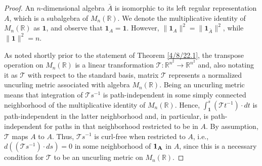 \documentclass{amsart}
\numberwithin{equation}{section}
\theoremstyle{definition}
\numberwithin{theorem}{section}
\begin{document}
\begin{proof} 
An $n$-dimensional algebra $\bar{A}$ is isomorphic to its left regular representation $A$, which is a subalgebra  of $ M_n(\mathbb{R})$.   We denote the multiplicative identity of $ M_n(\mathbb{R})$ as $\mathbf{1}$, and observe that $\mathbf{1}_A = \mathbf{1}$.  However, $\|\mathbf{1}_A\|^2 = \|\mathbf{1}_{\bar{A}}\|^2$, while $\|\mathbf{1}\|^2 = n$.   

As noted shortly prior to the statement of Theorem \ref{4/8/22.1}, the transpose operation on $ M_n(\mathbb{R})$ is a linear transformation $\mathcal{\mathcal{T}}:\mathbb{R}^{n^2}\rightarrow \mathbb{R}^{n^2}$ and, also notating it as $\mathcal{\mathcal{T}}$ with respect to the standard basis, matrix $\mathcal{\mathcal{T}}$ represents a normalized uncurling metric associated with algebra  $ M_n(\mathbb{R})$.  Being an uncurling metric means that integration of $\mathcal{\mathcal{T}}s^{-1}$ is path-independent in some simply connected neighborhood of the multiplicative identity of $ M_n(\mathbb{R})$.  
 Hence, $\int_\mathbf{1}^s (\mathcal{\mathcal{T}}t^{-1})\cdot dt$ is path-independent in the latter neighborhood and, in particular, is path-independent for paths in that neighborhood restricted to be in $A$.  By assumption, $\mathcal{\mathcal{T}}$ maps $A$ to $A$. 
 Thus, $\mathcal{\mathcal{T}}s^{-1}$ is curl-free when restricted to $A$, i.e., 
  $d((\mathcal{\mathcal{T}}s^{-1})\cdot ds) = 0$ in some neighborhood of $\bf{1}_A$ in $A$, since this is a necessary condition for $\mathcal{T}$ to be an uncurling metric on $ M_n(\mathbb{R})$.
  

\end{proof}
\end{document}
